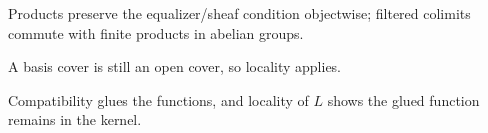 \begin{hint}
Products preserve the equalizer/sheaf condition objectwise; filtered colimits commute with finite products in abelian groups.
\end{hint}

\begin{hint}
A basis cover is still an open cover, so locality applies.
\end{hint}

\begin{hint}
Compatibility glues the functions, and locality of $L$ shows the glued function remains in the kernel.
\end{hint}
